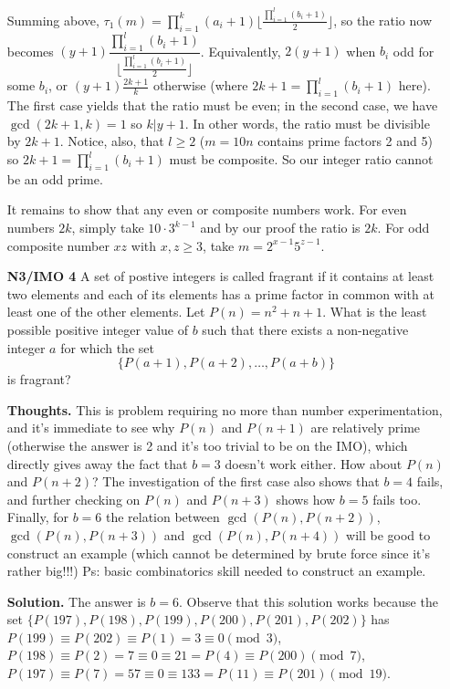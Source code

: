 \documentclass[11pt,a4paper]{article}
\begin{document}
\begin{itemize}
Summing above, $\tau_1 (m)=\displaystyle\prod_{i=1}^{k}(a_i+1)\lfloor\frac{\prod_{i=1}^{l}(b_i+1)}{2} \rfloor$, 
so the ratio now becomes 
$(y+1)\dfrac{\displaystyle\prod_{i=1}^{l}(b_i+1)}{\lfloor\frac{\prod_{i=1}^{l}(b_i+1)}{2} \rfloor}$. 
Equivalently, $2(y+1)$ when $b_i$ odd for some $b_i$, or $(y+1)\frac{2k+1}{k}$ otherwise (where $2k+1=\displaystyle\prod_{i=1}^{l}(b_i+1)$ here). 
The first case yields that the ratio must be even; in the second case, we have $\gcd(2k+1, k)=1$ so $k|y+1$. 
In other words, the ratio must be divisible by $2k+1$. 
Notice, also, that $l\ge 2$ ($m=10n$ contains prime factors 2 and 5) so $2k+1=\displaystyle\prod_{i=1}^{l}(b_i+1)$ must be composite. 
So our integer ratio cannot be an odd prime. 

It remains to show that any even or composite numbers work. 
For even numbers $2k$, simply take $10\cdot 3^{k-1}$ and by our proof the ratio is $2k$. 
For odd composite number $xz$ with $x, z\ge 3$, take $m=2^{x-1}5^{z-1}$. 

\item[\textbf{N3/IMO 4}]
A set of postive integers is called fragrant if it contains at least two elements and each of its elements has a prime factor in common with at least one of the other elements. Let $P(n)=n^2+n+1$. What is the least possible positive integer value of $b$ such that there exists a non-negative integer $a$ for which the set $$\{P(a+1),P(a+2),\ldots,P(a+b)\}$$is fragrant?

\textbf{Thoughts.} This is  problem requiring no more than number experimentation, 
and it's immediate to see why $P(n)$ and $P(n+1)$ are relatively prime (otherwise the answer is 2 and it's too trivial to be on the IMO), which directly gives away the fact that $b=3$ doesn't work either. 
How about $P(n)$ and $P(n+2)$? The investigation of the first case also shows that $b=4$ fails, and further checking on $P(n)$ and $P(n+3)$ shows how $b=5$ fails too. 
Finally, for $b=6$ the relation between $\gcd(P(n), P(n+2))$, $\gcd(P(n), P(n+3))$ and $\gcd(P(n), P(n+4))$ will be good to construct an example (which cannot be determined by brute force since it's rather big!!!)
Ps: basic combinatorics skill needed to construct an example. 

\textbf{Solution.} The answer is $b=6.$ 
Observe that this solution works because the set $\{P(197), P(198), P(199), P(200), P(201), P(202)\}$ has 
$P(199)\equiv P(202)\equiv P(1)=3\equiv 0\pmod{3}$, 
$P(198)\equiv P(2)=7\equiv 0\equiv 21=P(4)\equiv P(200)\pmod {7}$, 
$P(197)\equiv P(7)=57\equiv 0\equiv 133=P(11)\equiv P(201)\pmod{19}$. 


\end{itemize}
\end{document}
